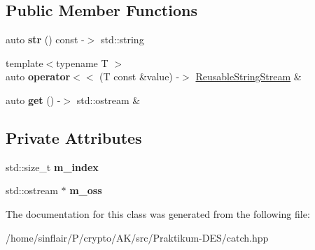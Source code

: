\subsection*{Public Member Functions}
\begin{DoxyCompactItemize}
\item 
\mbox{\label{classCatch_1_1ReusableStringStream_a0e9ecf260b2a5d35f4886ef0d51f6270}} 
auto {\bfseries str} () const -\/$>$ std\+::string
\item 
\mbox{\label{classCatch_1_1ReusableStringStream_af95f72024c082db70e5e50782e28e4f6}} 
{\footnotesize template$<$typename T $>$ }\\auto {\bfseries operator$<$$<$} (T const \&value) -\/$>$ \hyperlink{classCatch_1_1ReusableStringStream}{Reusable\+String\+Stream} \&
\item 
\mbox{\label{classCatch_1_1ReusableStringStream_a6881808c60a080d4e24a0b81c94cbf67}} 
auto {\bfseries get} () -\/$>$ std\+::ostream \&
\end{DoxyCompactItemize}
\subsection*{Private Attributes}
\begin{DoxyCompactItemize}
\item 
\mbox{\label{classCatch_1_1ReusableStringStream_a6e8154ffe67117de424c491e3b192504}} 
std\+::size\+\_\+t {\bfseries m\+\_\+index}
\item 
\mbox{\label{classCatch_1_1ReusableStringStream_ae8dc0aa8ab418990869cd5ea9ee51f14}} 
std\+::ostream $\ast$ {\bfseries m\+\_\+oss}
\end{DoxyCompactItemize}


The documentation for this class was generated from the following file\+:\begin{DoxyCompactItemize}
\item 
/home/sinflair/\+P/crypto/\+A\+K/src/\+Praktikum-\/\+D\+E\+S/catch.\+hpp\end{DoxyCompactItemize}
